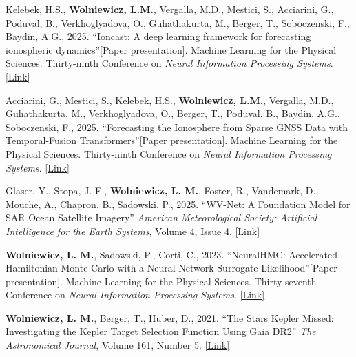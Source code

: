 \begin{cventries}
{\begin{cvitemize2}
        \vspace{1mm}
        \item \label{ioncast}
            Kelebek, H.S., \textbf{Wolniewicz, L.M.}, Vergalla, M.D., Mestici, S., Acciarini, G., Poduval, B., Verkhoglyadova, O., Guhathakurta, M., Berger, T., Soboczenski, F., Baydin, A.G., 2025. ``Ioncast: A deep learning framework for forecasting ionospheric dynamics''[Paper presentation]. Machine Learning for the Physical Sciences. Thirty-ninth Conference on \textit{Neural Information Processing Systems}. \href{https://ml4physicalsciences.github.io/2025/files/NeurIPS_ML4PS_2025_360.pdf}{\textcolor{link}{[Link]}}
        \vspace{1mm}
        \item \label{ionopy}
            Acciarini, G., Mestici, S., Kelebek, H.S., \textbf{Wolniewicz, L.M.}, Vergalla, M.D., Guhathakurta, M., Verkhoglyadova, O., Berger, T., Poduval, B., Baydin, A.G., Soboczenski, F., 2025. ``Forecasting the Ionosphere from Sparse GNSS Data with Temporal-Fusion Transformers''[Paper presentation]. Machine Learning for the Physical Sciences. Thirty-ninth Conference on \textit{Neural Information Processing Systems}. \href{https://ml4physicalsciences.github.io/2025/files/NeurIPS_ML4PS_2025_327.pdf}{\textcolor{link}{[Link]}}
        \vspace{1mm}
        \item \label{sar}
            Glaser, Y., Stopa, J. E., \textbf{Wolniewicz, L. M.}, Foster, R., Vandemark, D., Mouche, A., Chapron, B., Sadowski, P., 2025. ``WV-Net: A Foundation Model for SAR Ocean Satellite Imagery'' \textit{American Meteorological Society: Artificial Intelligence for the Earth Systems}, Volume 4, Issue 4. \href{https://journals.ametsoc.org/view/journals/aies/4/4/AIES-D-25-0003.1.xml}{\textcolor{link}{[Link]}}
         \vspace{1mm}
         \item \label{neuralhmc}
            \textbf{Wolniewicz, L. M.}, Sadowski, P., Corti, C., 2023. ``NeuralHMC: Accelerated Hamiltonian Monte Carlo with a Neural Network Surrogate Likelihood''[Paper presentation]. Machine Learning for the Physical Sciences. Thirty-seventh Conference on \textit{Neural Information Processing Systems}. \href{https://ml4physicalsciences.github.io/2023/files/NeurIPS_ML4PS_2023_74.pdf}{\textcolor{link}{[Link]}}
        \vspace{-2mm}
        \item \label{kepler}
            \textbf{Wolniewicz, L. M.}, Berger, T., Huber, D., 2021. ``The Stars Kepler Missed: Investigating the Kepler Target Selection Function Using Gaia DR2'' \textit{The Astronomical Journal}, Volume 161, Number 5. \href{https://iopscience.iop.org/article/10.3847/1538-3881/abee1d}{\textcolor{link}{[Link]}}

\end{cvitemize2}}
\end{cventries}
